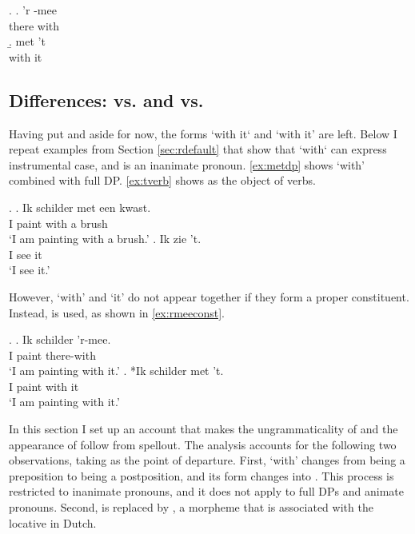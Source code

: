 \documentclass[12pt]{article}
\begin{document}
\ex.
\ag. 'r -mee\\
there with\\
\b. met 't\\
with it\\





\subsection{Differences:  vs.  and  vs. }

Having put  and  aside for now, the forms  `with it` and  `with it' are left. Below I repeat examples from Section \ref{sec:rdefault} that show that  `with` can express instrumental case, and  is an inanimate pronoun. \ref{ex:metdp} shows  `with' combined with full DP. \ref{ex:tverb} shows  as the object of verbs.

\ex.
\ag. Ik schilder met een kwast.\\
 I paint with a brush\\
 `I am painting with a brush.'\label{ex:metdp}
 \bg. Ik zie 't.\\
  I see it\\
  `I see it.'\label{ex:tverb}

However,  `with' and  `it' do not appear together if they form a proper constituent. Instead,  is used, as shown in \ref{ex:rmeeconst}.

\ex.\label{ex:rmeeconst}
\ag. Ik schilder 'r-mee.\\
 I paint there-with\\
 `I am painting with it.'\label{ex:jarmee}
\bg. *Ik schilder met 't.\\
 I paint with it\\
 `I am painting with it.'\label{ex:neemett}

In this section I set up an account that makes the ungrammaticality of  and the appearance of  follow from spellout. The analysis accounts for the following two observations, taking  as the point of departure. First,  `with' changes from being a preposition to being a postposition, and its form changes into . This process is restricted to inanimate pronouns, and it does not apply to full DPs and animate pronouns. Second,  is replaced by , a morpheme that is associated with the locative in Dutch.
\end{document}
